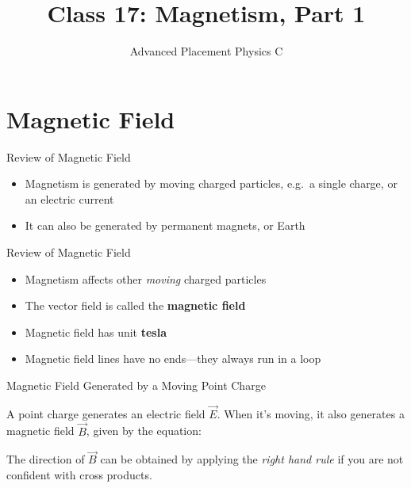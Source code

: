 \documentclass[12pt,aspectratio=169]{beamer}
\title{Class 17: Magnetism, Part 1}
\subtitle{Advanced Placement Physics C}
\begin{document}
\begin{frame}
  \maketitle
\end{frame}


\section{Magnetic Field}

\begin{frame}{Review of Magnetic Field}
  \begin{itemize}
  \item Magnetism is generated by moving charged particles, e.g.\ a single
    charge, or an electric current
  \item It can also be generated by permanent magnets, or Earth
  \end{itemize}
\end{frame}



\begin{frame}{Review of Magnetic Field}
  \begin{itemize}
  \item Magnetism affects other \emph{moving} charged particles
  \item The vector field is called the \textbf{magnetic field}
  \item Magnetic field has unit \textbf{tesla}
  \item Magnetic field lines have no ends---they always run in a loop
  \end{itemize}
\end{frame}



\begin{frame}{Magnetic Field Generated by a Moving Point Charge}
  \begin{center}
  \end{center}
  A point charge generates an electric field $\vec E$. When it's moving, it
  also generates a magnetic field $\vec B$, given by the equation:


  The direction of $\vec B$ can be obtained by applying the
  \emph{right hand rule} if you are not confident with cross products.
\end{frame}
\end{document}
